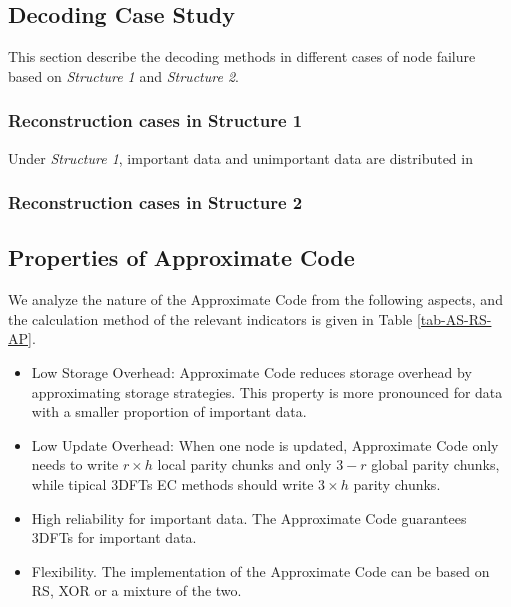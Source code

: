 \documentclass[sigconf]{acmart}
\begin{document}
\subsection{Decoding Case Study}
This section describe the decoding methods in different cases of node failure based on \emph{Structure 1} and \emph{Structure 2}.

\subsubsection{Reconstruction cases in Structure 1}
Under \emph{Structure 1}, important data and unimportant data are distributed in 

\subsubsection{Reconstruction cases in Structure 2}

\subsection{Properties of Approximate Code}

We analyze the nature of the Approximate Code from the following aspects, and the calculation method of the relevant indicators is given in Table \ref{tab-AS-RS-AP}.
\begin{itemize}
    \item Low Storage Overhead: Approximate Code reduces storage overhead by approximating storage strategies. This property is more pronounced for data with a smaller proportion of important data.
    \item Low Update Overhead: When one node is updated, Approximate Code only needs to write $r \times h$ local parity chunks and only $3-r$ global parity chunks, while tipical 3DFTs EC methods should write $3 \times h$ parity chunks.
    \item High reliability for important data. The Approximate Code guarantees 3DFTs for important data.
    \item Flexibility. The implementation of the Approximate Code can be based on RS, XOR or a mixture of the two.
\end{itemize}
\end{document}
